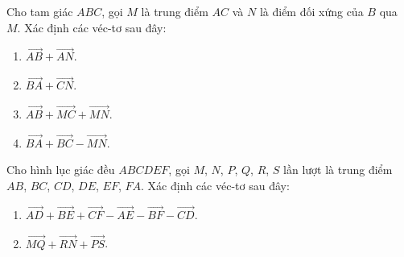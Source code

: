 \begin{bt}%
Cho tam giác $ABC$, gọi $M$ là trung điểm $AC$ và $N$ là điểm đối xứng của $B$ qua $M$. Xác định các véc-tơ sau đây:
\begin{multicols}{2}
\begin{enumerate}
	\item $\vec{AB}+\vec{AN}$.
	\item $\vec{BA}+\vec{CN}$.
	\item $\vec{AB}+\vec{MC}+\vec{MN}$.
	\item $\vec{BA}+\vec{BC}-\vec{MN}$.
\end{enumerate}
\end{multicols}
\end{bt}
\begin{bt}%
	Cho hình lục giác đều $ABCDEF$, gọi $M$, $N$, $P$, $Q$, $R$, $S$ lần lượt là trung điểm $AB$, $BC$, $CD$, $DE$, $EF$, $FA$.
	Xác định các véc-tơ sau đây:
	\begin{multicols}{2}
		\begin{enumerate} 
			\item $\vec{AD}+\vec{BE}+\vec{CF}-\vec{AE}-\vec{BF}-\vec{CD}$.
			\item $\vec{MQ}+\vec{RN}+\vec{PS}$.
		\end{enumerate}
	\end{multicols}
\end{bt}
